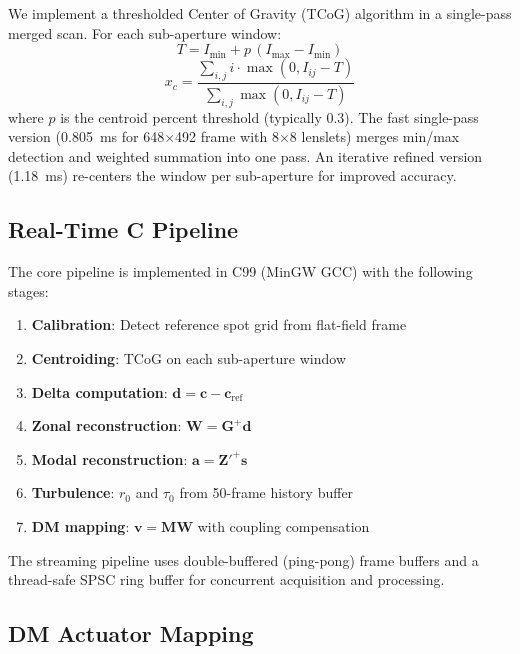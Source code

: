 \documentclass[twocolumn,10pt]{IEEEtran}
\begin{document}
We implement a thresholded Center of Gravity (TCoG) algorithm in a single-pass merged scan. For each sub-aperture window:
\begin{equation}
T = I_{\min} + p\,(I_{\max} - I_{\min})
\end{equation}
\begin{equation}
x_c = \frac{\sum_{i,j} i \cdot \max(0, I_{ij} - T)}{\sum_{i,j} \max(0, I_{ij} - T)}
\end{equation}
where $p$ is the centroid percent threshold (typically 0.3). The fast single-pass version (0.805~ms for 648$\times$492 frame with 8$\times$8 lenslets) merges min/max detection and weighted summation into one pass. An iterative refined version (1.18~ms) re-centers the window per sub-aperture for improved accuracy.

\subsection{Real-Time C Pipeline}
\label{sec:pipeline}

The core pipeline is implemented in C99 (MinGW GCC) with the following stages:

\begin{enumerate}
\item \textbf{Calibration}: Detect reference spot grid from flat-field frame
\item \textbf{Centroiding}: TCoG on each sub-aperture window
\item \textbf{Delta computation}: $\mathbf{d} = \mathbf{c} - \mathbf{c}_{\text{ref}}$
\item \textbf{Zonal reconstruction}: $\mathbf{W} = \mathbf{G}^{+}\mathbf{d}$
\item \textbf{Modal reconstruction}: $\mathbf{a} = \mathbf{Z}'^{+}\mathbf{s}$
\item \textbf{Turbulence}: $r_0$ and $\tau_0$ from 50-frame history buffer
\item \textbf{DM mapping}: $\mathbf{v} = \mathbf{M}\mathbf{W}$ with coupling compensation
\end{enumerate}

The streaming pipeline uses double-buffered (ping-pong) frame buffers and a thread-safe SPSC ring buffer for concurrent acquisition and processing.

\subsection{DM Actuator Mapping}
\label{sec:dm}
\end{document}
